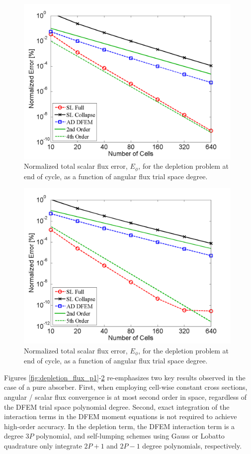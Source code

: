 \begin{figure}[!htp]
\centering
\includegraphics[width=11cm]{chapter5_depletion/Flux_P3_norm_err.png}
\caption{Normalized total scalar flux error, $E_{\phi}$, for the depletion problem at end of cycle, as a function of angular flux trial space degree.}
\label{fig:depletion_flux_p3}
\end{figure}

\begin{figure}[!hbp]
\centering
\includegraphics[width=11cm]{chapter5_depletion/Flux_P4_norm_err.png}
\caption{Normalized total scalar flux error, $E_{\phi}$, for the depletion problem at end of cycle, as a function of angular flux trial space degree.}
\label{fig:depletion_flux_p4}
\end{figure}
Figures \ref{fig:depletion_flux_p1}-\ref{fig:depletion_flux_p4} re-emphasizes two key results observed in the case of a pure absorber.
First, when employing cell-wise constant cross sections, angular / scalar flux convergence is at most second order in space, regardless of the DFEM trial space polynomial degree.
Second, exact integration of the interaction terms in the DFEM moment equations is not required to achieve high-order accuracy.
In the depletion term, the DFEM interaction term is a degree $3P$ polynomial, and self-lumping schemes using Gauss or Lobatto quadrature only integrate $2P+1$ and $2P-1$ degree polynomials, respectively.

